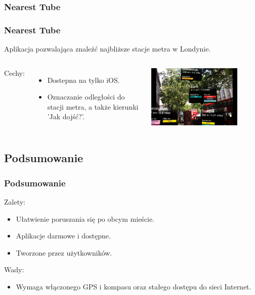 \subsubsection{Nearest Tube}
\begin{frame}
\frametitle{Nearest Tube}
Aplikacja pozwalająca znaleźć najbliższe stacje metra w Londynie.
\vspace*{1cm}
\begin{columns}

Cechy: 
\begin{itemize}
\item Dostepna na tylko iOS.
\item Oznaczanie odległości do stacji metra, a także kierunki 'Jak dojść?'.
\end{itemize}
\includegraphics[width=0.8\textwidth]{nearest_tube}
\end{columns}
\end{frame}

\subsection{Podsumowanie}
\begin{frame}
\frametitle{Podsumowanie}
Zalety:
\begin{itemize}
    \item Ułatwienie poruszania się po obcym mieście.
    \item Aplikacje darmowe i dostępne.
    \item Tworzone przez użytkowników.
\end{itemize}
Wady:
\begin{itemize}
    \item Wymaga włączonego GPS i kompasu oraz stałego dostępu do sieci
        Internet.
\end{itemize}
\end{frame}
